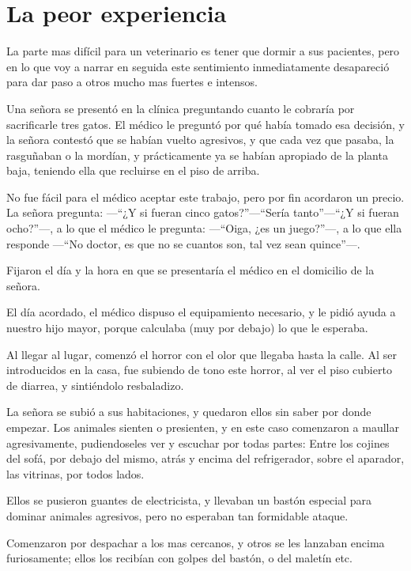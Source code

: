\documentclass[letterpaper, 12pt]{book}
\begin{document}
\chapter{La peor experiencia}

La parte mas difícil para un veterinario es tener que dormir a sus pacientes, pero en lo que voy a narrar en seguida este sentimiento inmediatamente desapareció para dar paso a otros mucho mas fuertes e intensos.

Una señora se presentó en la clínica preguntando cuanto le cobraría por sacrificarle tres gatos. El médico le preguntó por qué había tomado esa decisión, y la señora contestó que se habían vuelto agresivos, y que cada vez que pasaba, la rasguñaban o la mordían, y prácticamente ya se habían apropiado de la planta baja, teniendo ella que recluirse en el piso de arriba.

No fue fácil para el médico aceptar este trabajo, pero por fin acordaron un precio. La señora pregunta: ---``¿Y si fueran cinco gatos?''---``Sería tanto''---``¿Y si fueran ocho?''---, a lo que el médico le pregunta: ---``Oiga, ¿es un juego?''---, a lo que ella responde ---``No doctor, es que no se cuantos son, tal vez sean quince''---. 

Fijaron el día y la hora en que se presentaría el médico en el domicilio de la señora.

El día acordado, el médico dispuso el equipamiento necesario, y le pidió ayuda a nuestro hijo mayor, porque calculaba (muy por debajo) lo que le esperaba. 

Al llegar al lugar, comenzó el horror con el olor que llegaba hasta la calle. Al ser introducidos en la casa, fue subiendo de tono este horror, al ver el piso cubierto de diarrea, y sintiéndolo resbaladizo.

La señora se subió a sus habitaciones, y quedaron ellos sin saber por donde empezar. Los animales sienten o presienten, y en este caso comenzaron a maullar agresivamente, pudiendoseles ver y escuchar por todas partes: Entre los cojines del sofá, por debajo del mismo, atrás y encima del refrigerador, sobre el aparador, las vitrinas, por todos lados. 

Ellos se pusieron guantes de electricista, y llevaban un bastón especial para dominar animales agresivos, pero no esperaban tan formidable ataque.

Comenzaron por despachar a los mas cercanos, y otros se les lanzaban encima furiosamente; ellos los recibían con golpes del bastón, o del maletín etc.
\end{document}
